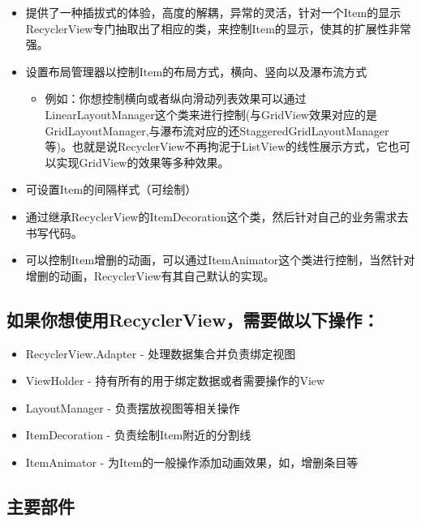 \documentclass[9pt, b5paper]{article}
\begin{document}
\begin{itemize}
\begin{itemize}
\item 提供了一种插拔式的体验，高度的解耦，异常的灵活，针对一个Item的显示RecyclerView专门抽取出了相应的类，来控制Item的显示，使其的扩展性非常强。
\item 设置布局管理器以控制Item的布局方式，横向、竖向以及瀑布流方式
\begin{itemize}
\item 例如：你想控制横向或者纵向滑动列表效果可以通过LinearLayoutManager这个类来进行控制(与GridView效果对应的是GridLayoutManager,与瀑布流对应的还StaggeredGridLayoutManager等)。也就是说RecyclerView不再拘泥于ListView的线性展示方式，它也可以实现GridView的效果等多种效果。
\end{itemize}
\item 可设置Item的间隔样式（可绘制）
\item 通过继承RecyclerView的ItemDecoration这个类，然后针对自己的业务需求去书写代码。
\item 可以控制Item增删的动画，可以通过ItemAnimator这个类进行控制，当然针对增删的动画，RecyclerView有其自己默认的实现。
\end{itemize}
\end{itemize}

\subsection{如果你想使用RecyclerView，需要做以下操作：}
\label{sec-5-2}
\begin{itemize}
\item RecyclerView.Adapter - 处理数据集合并负责绑定视图
\item ViewHolder - 持有所有的用于绑定数据或者需要操作的View
\item LayoutManager - 负责摆放视图等相关操作
\item ItemDecoration - 负责绘制Item附近的分割线
\item ItemAnimator - 为Item的一般操作添加动画效果，如，增删条目等
\end{itemize}

\subsection{主要部件}
\label{sec-5-3}
\end{document}
